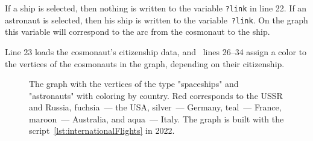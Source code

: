 If a ship is selected, then nothing is written to the variable \lstinline|?link| in line 22. If an astronaut is selected, then his ship is written to the variable~\lstinline|?link|. On the graph this variable will correspond to the arc from the cosmonaut to the ship. 

Line 23 loads the cosmonaut's citizenship data, and~ lines 26--34 assign a color to the vertices of the cosmonauts in the graph, depending on their citizenship. 

\begin{figure}[h]
  \setlength{\fboxsep}{0pt}%
  \setlength{\fboxrule}{1pt}%
  \caption[The graph with the vertices of the type "spaceships" and "astronauts" with coloring by country]{The graph with the vertices of the type "spaceships" and "astronauts" with coloring by country. Red corresponds to the USSR and Russia, fuchsia~--- the USA, silver~--- Germany, teal~--- France, maroon~--- Australia, and aqua~--- Italy. The graph is built with the script~\protect\ref{lst:internationalFlights} in 2022.}
  \label{fig:internationalFlights}%
\end{figure}
